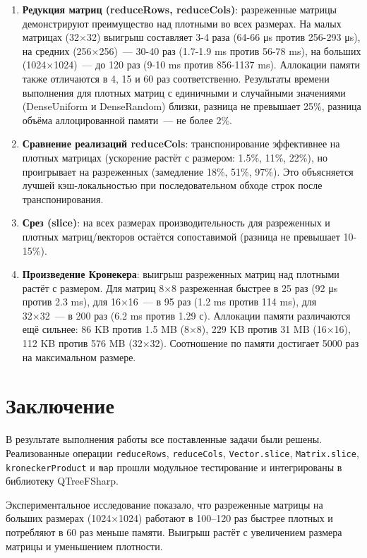 \documentclass[a4paper]{article}
\begin{document}
\begin{enumerate}
    \item \textbf{Редукция матриц (reduceRows, reduceCols)}: разреженные матрицы демонстрируют преимущество над плотными во всех размерах. На малых матрицах (32×32) выигрыш составляет 3-4 раза (64-66 μs против 256-293 μs), на средних (256×256)~--- 30-40 раз (1.7-1.9 ms против 56-78 ms), на больших (1024×1024)~--- до 120 раз (9-10 ms против 856-1137 ms). Аллокации памяти также отличаются в 4, 15 и 60 раз соответственно. Результаты времени выполнения для плотных матриц с единичными и случайными значениями (DenseUniform и DenseRandom) близки, разница не превышает 25\%, разница объёма аллоцированной памяти~--- не более 2\%.

    \item \textbf{Сравнение реализаций reduceCols}: транспонирование эффективнее на плотных матрицах (ускорение растёт с размером: 1.5\%, 11\%, 22\%), но проигрывает на разреженных (замедление 18\%, 51\%, 97\%). Это объясняется лучшей кэш-локальностью при последовательном обходе строк после транспонирования.

    \item \textbf{Срез (slice)}: на всех размерах производительность для разреженных и плотных матриц/векторов остаётся сопоставимой (разница не превышает 10-15\%).

    \item \textbf{Произведение Кронекера}: выигрыш разреженных матриц над плотными растёт с размером. Для матриц 8×8 разреженная быстрее в 25 раз (92 μs против 2.3 ms), для 16×16~--- в 95 раз (1.2 ms против 114 ms), для 32×32~--- в 200 раз (6.2 ms против 1.29 с). Аллокации памяти различаются ещё сильнее: 86 KB против 1.5 MB (8×8), 229 KB против 31 MB (16×16), 112 KB против 576 MB (32×32). Соотношение по памяти достигает 5000 раз на максимальном размере.
\end{enumerate}

\section*{Заключение}
В результате выполнения работы все поставленные задачи были решены. Реализованные операции \texttt{reduceRows}, \texttt{reduceCols}, \texttt{Vector.slice}, \texttt{Matrix.slice}, \texttt{kroneckerProduct} и \texttt{map} прошли модульное тестирование и интегрированы в библиотеку QTreeFSharp.

Экспериментальное исследование показало, что разреженные матрицы на больших размерах (1024×1024) работают в 100–120 раз быстрее плотных и потребляют в 60 раз меньше памяти. Выигрыш растёт с увеличением размера матрицы и уменьшением плотности.
\end{document}
